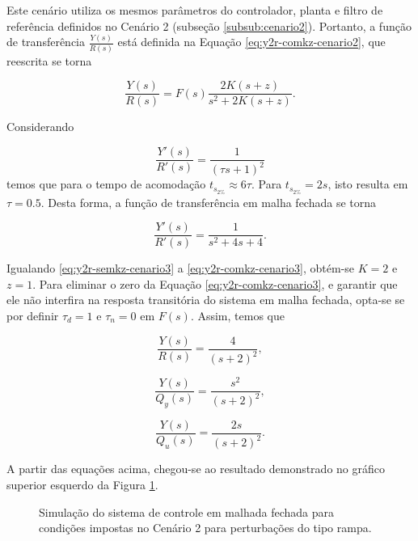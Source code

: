 Este cenário utiliza os mesmos parâmetros do controlador, planta e filtro de
referência definidos no Cenário 2 (subseção \ref{subsub:cenario2}). Portanto, a
função de transferência $\frac{Y(s)}{R(s)}$ está definida na Equação
\ref{eq:y2r-comkz-cenario2}, que reescrita se torna 

\begin{equation}
    \label{eq:y2r-comkz-cenario3}
    \frac{Y(s)}{R(s)} = F(s)\frac{2K(s + z)}{s^2 + 2K(s + z)}.
\end{equation}

Considerando

\begin{equation}
    \label{eq:y2r-com-polos-iguais-cenario3}
    \frac{Y'(s)}{R'(s)} = \frac{1}{(\tau s + 1)^2}
\end{equation}
temos que para o tempo de acomodação $t_{s_{2\%}} \approx 6\tau$. Para
$t_{s_{2\%}} = 2s$, isto resulta em $\tau = 0.5$. Desta forma, a função de
transferência em malha fechada se torna

\begin{equation}
    \label{eq:y2r-semkz-cenario3}
    \frac{Y'(s)}{R'(s)} = \frac{1}{s^2 + 4s + 4}.
\end{equation}

Igualando \ref{eq:y2r-semkz-cenario3} a \ref{eq:y2r-comkz-cenario3}, obtém-se $K
= 2$ e $z = 1$. Para eliminar o zero da Equação \ref{eq:y2r-comkz-cenario3}, e
garantir que ele não interfira na resposta transitória do sistema em malha
fechada, opta-se se por definir $\tau_{d} = 1$ e $\tau_{n} = 0$ em $F(s)$. Assim,
temos que

\begin{equation}
    \label{eq:y2r-solucionado-cenario3}
    \frac{Y(s)}{R(s)} = \frac{4}{(s + 2)^2},
\end{equation}

\begin{equation}
    \label{eq:y2qy-solucionado-cenario3}
    \frac{Y(s)}{Q_{y}(s)} = \frac{s^2}{(s + 2)^2},
\end{equation}

\begin{equation}
    \label{eq:y2qu-solucionado-cenario3}
    \frac{Y(s)}{Q_{u}(s)} = \frac{2s}{(s + 2)^2}.
\end{equation}

A partir das equações acima, chegou-se ao resultado demonstrado no gráfico
superior esquerdo da Figura \ref{fig:resultado-cenario3}.

\begin{figure}[!ht]
    \caption{Simulação do sistema de controle em malhada fechada para condições
    impostas no Cenário 2 para perturbações do tipo rampa.}
    \vspace{-10pt}
    \hspace{-30pt}
    \label{fig:resultado-cenario3}
    \begin{minipage}{\linewidth}
        
    \end{minipage}
\end{figure}

